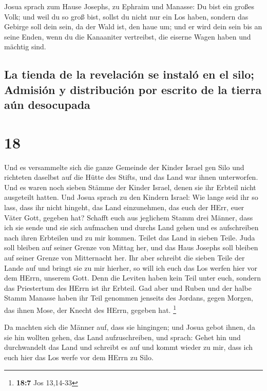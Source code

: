  Josua sprach zum Hause Josephs, zu Ephraim und Manasse:
Du bist ein großes Volk; und weil du so groß bist, sollst du nicht nur
ein Los haben,  sondern das Gebirge soll dein sein, da
der Wald ist, den haue um; und er wird dein sein bis an seine Enden,
wenn du die Kanaaniter vertreibst, die eiserne Wagen haben und mächtig
sind.

\hypertarget{la-tienda-de-la-revelaciuxf3n-se-instaluxf3-en-el-silo-admisiuxf3n-y-distribuciuxf3n-por-escrito-de-la-tierra-auxfan-desocupada}{%
\subsection{La tienda de la revelación se instaló en el silo; Admisión y
distribución por escrito de la tierra aún
desocupada}\label{la-tienda-de-la-revelaciuxf3n-se-instaluxf3-en-el-silo-admisiuxf3n-y-distribuciuxf3n-por-escrito-de-la-tierra-auxfan-desocupada}}

\hypertarget{section-17}{%
\section{18}\label{section-17}}

 Und es versammelte sich die ganze Gemeinde der Kinder
Israel gen Silo und richteten daselbst auf die Hütte des Stifts, und das
Land war ihnen unterworfen.  Und es waren noch sieben
Stämme der Kinder Israel, denen sie ihr Erbteil nicht ausgeteilt hatten.
 Und Josua sprach zu den Kindern Israel: Wie lange seid
ihr so lass, dass ihr nicht hingeht, das Land einzunehmen, das euch der
HErr, euer Väter Gott, gegeben hat?  Schafft euch aus
jeglichem Stamm drei Männer, dass ich sie sende und sie sich aufmachen
und durchs Land gehen und es aufschreiben nach ihren Erbteilen und zu
mir kommen.  Teilet das Land in sieben Teile. Juda soll
bleiben auf seiner Grenze von Mittag her, und das Haus Josephs soll
bleiben auf seiner Grenze von Mitternacht her.  Ihr aber
schreibt die sieben Teile der Lande auf und bringt sie zu mir hierher,
so will ich euch das Los werfen hier vor dem HErrn, unserem Gott.
 Denn die Leviten haben kein Teil unter euch, sondern das
Priestertum des HErrn ist ihr Erbteil. Gad aber und Ruben und der halbe
Stamm Manasse haben ihr Teil genommen jenseits des Jordans, gegen
Morgen, das ihnen Mose, der Knecht des HErrn, gegeben hat. \footnote{\textbf{18:7}
  Jos 13,14-33}

 Da machten sich die Männer auf, dass sie hingingen; und
Josua gebot ihnen, da sie hin wollten gehen, das Land aufzuschreiben,
und sprach: Gehet hin und durchwandelt das Land und schreibt es auf und
kommt wieder zu mir, dass ich euch hier das Los werfe vor dem HErrn zu
Silo.

